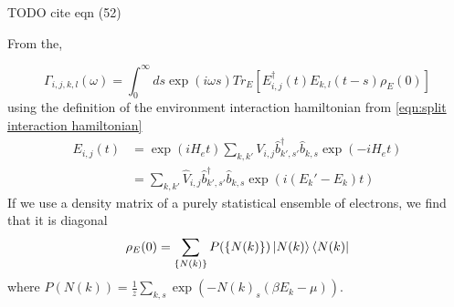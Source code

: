 
TODO cite eqn (52)

From the,

\begin{equation}
  \Gamma_{i,j, k,l}(\omega) =
  \int_0^\infty{}{
  ds \exp{(i\omega{}s)}
  Tr_{E}[E^\dagger_{i,j}(t)E_{k,l}(t-s)\rho_E(0)]
  }
\end{equation}
using the definition of the
environment interaction hamiltonian
from \cref{eqn:split interaction hamiltonian}
\begin{align}
  E_{i, j}(t) & =
  \exp{(iH_e t)}
  \sum_{k,k'} V_{i,j} \hat{b}^\dagger_{k',s'}\hat{b}_{k,s}
  \exp{(-iH_e t)}                           \\
              & = \sum_{k,k'} \hat{V}_{i,j}
  \hat{b}^\dagger_{k',s'}\hat{b}_{k,s} \exp{(i(E_k' - E_k)t)}
\end{align}
If we use a density matrix of a purely
statistical ensemble of electrons,
we find that it is
diagonal~\cite{sakurai_napolitano_2020}
\begin{equation}
  \rho_E(0) = \sum_{\{N(k)\}}
  P(\{N(k)\})
  \ket{N(k)} \bra{N(k)}
\end{equation}
where \(P(N(k)) =
\frac{1}{z}\sum_{k,s}
\exp{(-{N(k)}_s(\beta E_k - \mu))}\).

